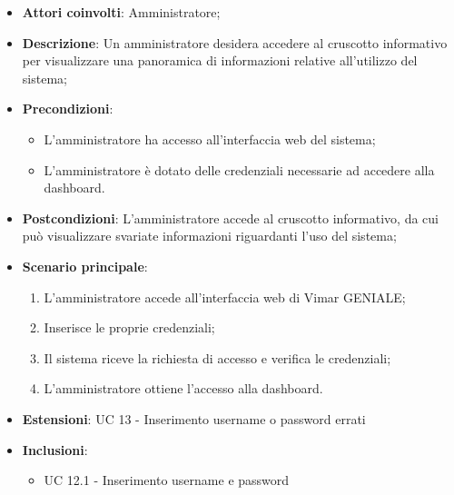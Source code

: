 \begin{itemize}
    \item \textbf{Attori coinvolti}: Amministratore;
    \item \textbf{Descrizione}: Un amministratore desidera accedere al cruscotto informativo per visualizzare una panoramica di informazioni relative all’utilizzo del sistema;
    \item \textbf{Precondizioni}: 
        \begin{itemize}
            \item L’amministratore ha accesso all’interfaccia web del sistema;
            \item L’amministratore è dotato delle credenziali necessarie ad accedere alla dashboard.
        \end{itemize}
    \item \textbf{Postcondizioni}: L’amministratore accede al cruscotto informativo, da cui può visualizzare svariate informazioni riguardanti l’uso del sistema;
    \item \textbf{Scenario principale}:
    \begin{enumerate}
    \item L’amministratore accede all’interfaccia web di Vimar GENIALE;
    \item Inserisce le proprie credenziali;
    \item Il sistema riceve la richiesta di accesso e verifica le credenziali;
    \item L’amministratore ottiene l’accesso alla dashboard.
    \end{enumerate}
    \item \textbf{Estensioni}: UC 13 - Inserimento username o password errati
    \item \textbf{Inclusioni}: 
        \begin{itemize}
            \item UC 12.1 - Inserimento username e password
        \end{itemize}
\end{itemize}


